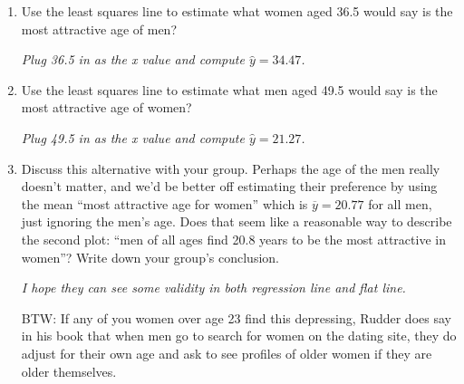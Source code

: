 \begin{enumerate}
\item Use the least squares line to estimate what women aged 36.5
  would say is the most attractive age of men?
\begin{students}
 \vspace{1.5cm}      
\end{students}

\begin{key}
  {\it     Plug 36.5 in as the x value and compute $\hat{y} = 34.47$.}
\end{key}

  \item Use the least squares line to estimate what men aged 49.5
    would say is the  most attractive age of women? 
\begin{students}
 \vspace{1.5cm}      
\end{students}

\begin{key}
  {\it     Plug 49.5 in as the x value and compute $\hat{y} = 21.27$.}
\end{key}

\item Discuss this alternative with your group.  Perhaps the age of
  the men really doesn't matter, and we'd be better off estimating
  their preference by using the mean ``most attractive age for women''
  which is $\overline{y} = 20.77$ for all men, just ignoring the men's age.
   Does that seem like a reasonable way to describe the second plot:
   ``men of all ages find 20.8 years to be the most attractive in women''?
  Write down your group's conclusion.
  \begin{students}
 \vspace{2cm}      
\end{students}

\begin{key}
  {\it    I hope they can see some validity in both regression line
    and flat line.}
\end{key}

  BTW: If any of you women over age 23 find this depressing, Rudder
  does say in his book that when men go to search for women on the
  dating site, they do adjust for their own age and ask to see
  profiles of older women if they are older themselves.  %



\end{enumerate}
